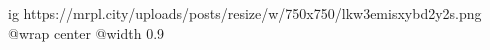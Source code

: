  
 
 
 
 

\ifcmt
  ig https://mrpl.city/uploads/posts/resize/w/750x750/lkw3emisxybd2y2s.png
  @wrap center
  @width 0.9
\fi
